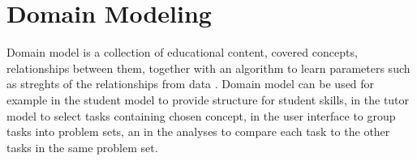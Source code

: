 

\section{Domain Modeling}
\label{sec:domain-modeling}

Domain model is a collection of educational content, covered concepts,
relationships between them, together with an algorithm to learn
parameters such as streghts of the relationships from data
\cite{its-domain-models}.
Domain model can be used for example in the student model to provide structure
for student skills, in the tutor model to select tasks containing chosen
concept, in the user interface to group tasks into problem sets, an in the
analyses to compare each task to the other tasks in the same problem set.

